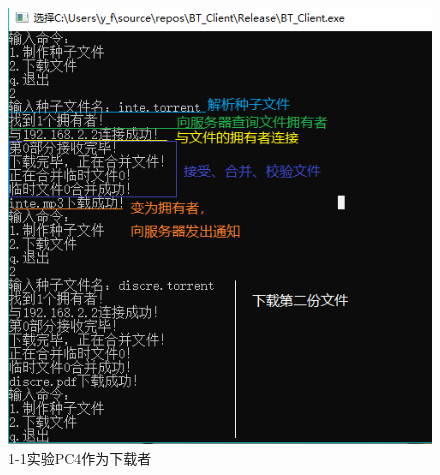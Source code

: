 \documentclass[thesis]{thesis}
\begin{document}
	\begin{minipage}{0.5\linewidth}
	\begin{figure}[H]
		\centering
		\includegraphics[width=\linewidth]{fig/PC4_11.png}
		\caption{1-1实验\quad PC4作为下载者}
		\label{res:PC4_11}
	\end{figure}
	\end{minipage}
	
\end{document}
